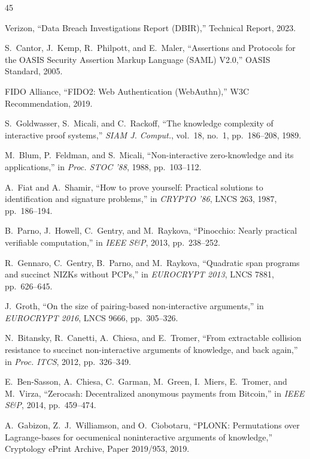 \documentclass[journal,twoside,10pt]{IEEEtran}
\begin{document}
\begin{thebibliography}{45}

Verizon, ``Data Breach Investigations Report (DBIR),'' Technical Report, 2023.

S.~Cantor, J.~Kemp, R.~Philpott, and E.~Maler, ``Assertions and Protocols
for the OASIS Security Assertion Markup Language (SAML) V2.0,'' OASIS
Standard, 2005.

FIDO Alliance, ``FIDO2: Web Authentication (WebAuthn),'' W3C Recommendation,
2019.

S.~Goldwasser, S.~Micali, and C.~Rackoff, ``The knowledge complexity of
interactive proof systems,'' \emph{SIAM J. Comput.}, vol.~18, no.~1,
pp.~186--208, 1989.

M.~Blum, P.~Feldman, and S.~Micali, ``Non-interactive zero-knowledge and
its applications,'' in \emph{Proc. STOC '88}, 1988, pp.~103--112.

A.~Fiat and A.~Shamir, ``How to prove yourself: Practical solutions to
identification and signature problems,'' in \emph{CRYPTO '86}, LNCS 263,
1987, pp.~186--194.

B.~Parno, J.~Howell, C.~Gentry, and M.~Raykova, ``Pinocchio: Nearly
practical verifiable computation,'' in \emph{IEEE S\&P}, 2013, pp.~238--252.

R.~Gennaro, C.~Gentry, B.~Parno, and M.~Raykova, ``Quadratic span programs
and succinct NIZKs without PCPs,'' in \emph{EUROCRYPT 2013}, LNCS 7881,
pp.~626--645.

J.~Groth, ``On the size of pairing-based non-interactive arguments,'' in
\emph{EUROCRYPT 2016}, LNCS 9666, pp.~305--326.

N.~Bitansky, R.~Canetti, A.~Chiesa, and E.~Tromer, ``From extractable
collision resistance to succinct non-interactive arguments of knowledge,
and back again,'' in \emph{Proc. ITCS}, 2012, pp.~326--349.

E.~Ben-Sasson, A.~Chiesa, C.~Garman, M.~Green, I.~Miers, E.~Tromer, and
M.~Virza, ``Zerocash: Decentralized anonymous payments from Bitcoin,'' in
\emph{IEEE S\&P}, 2014, pp.~459--474.

A.~Gabizon, Z.~J.~Williamson, and O.~Ciobotaru, ``PLONK: Permutations over
Lagrange-bases for oecumenical noninteractive arguments of knowledge,''
Cryptology ePrint Archive, Paper 2019/953, 2019.


\end{thebibliography}
\end{document}
